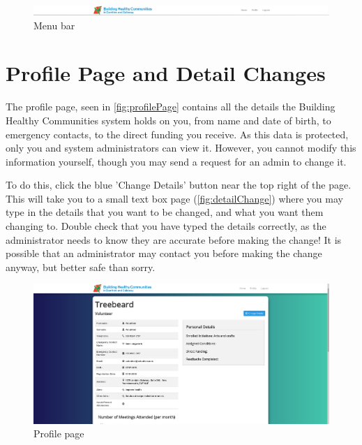\documentclass{bhcguides}
\begin{document}
\begin{figure}[h]
 \centerline{\includegraphics[width=\textwidth, height=\textheight, keepaspectratio]{menubar.png}}
 \caption{Menu bar}
 \label{fig:menuBar}
\end{figure}

\pagebreak

\section{Profile Page and Detail Changes}
\label{sec:profile}

The profile page, seen in \autoref{fig:profilePage} contains all the details the Building Healthy Communities system holds on you, from name and date of birth, to emergency contacts, to the direct funding you receive. As this data is protected, only you and system administrators can view it. However, you cannot modify this information yourself, though you may send a request for an admin to change it. 

To do this, click the blue 'Change Details' button near the top right of the page. This will take you to a small text box page (\autoref{fig:detailChange}) where you may type in the details that you want to be changed, and what you want them changing to. Double check that you have typed the details correctly, as the administrator needs to know they are accurate before making the change! It is possible that an administrator may contact you before making the change anyway, but better safe than sorry.

\begin{figure}[h]
 \centerline{\includegraphics[width=\textwidth, height=\textheight, keepaspectratio]{profilepage.png}}
 \caption{Profile page}
 \label{fig:profilePage}
\end{figure}
\end{document}
